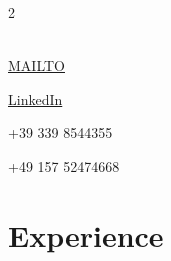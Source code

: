 \documentclass[lighthipster]{simplehipstercv}
\begin{document}
\begin{paracol}{2}
{    \vfill

    \\[0.5em]


     \href{mailto:daniele.ronchetti@outlook.it}{MAILTO}

     \href{https://www.linkedin.com/in/daniele-ronchetti/}{LinkedIn}

     +39 339 8544355

     +49 157 52474668

    \phantom{turn the page}
    \phantom{turn the page}
    }
    \switchcolumn

    \small
    \section*{Experience}


\end{paracol}
\end{document}
